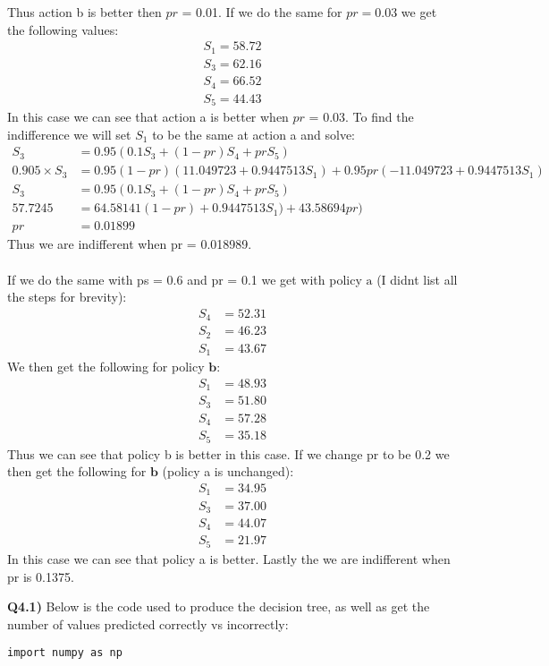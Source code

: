 \documentclass{article}
\begin{document}
\begin{titlepage}
Thus action b is better then $pr$ = 0.01. If we do the same for $pr = 0.03$ we get the following values:
\begin{align*}
S_1 = 58.72\\
S_3 = 62.16\\
S_4 = 66.52\\
S_5 = 44.43
\end{align*}
In this case we can see that action a is better when $pr$ = 0.03. To find the indifference we will set $S_1$ to be the same at action a and solve:
\newpage
\begin{align*}
S_3 &= 0.95(0.1S_3 + (1-pr)S_4 +  prS_5) \\
0.905\times S_3 &= 0.95(1-pr)(11.049723 + 0.9447513S_1) + 0.95pr(-11.049723 + 0.9447513S_1) \\
S_3 &= 0.95(0.1S_3 + (1-pr)S_4 +  prS_5) \\
57.7245 &= 64.58141(1-pr) + 0.9447513S_1) + 43.58694pr) \\
pr &= 0.01899
\end{align*}
Thus we are indifferent when pr = 0.018989.\\\\
If we do the same with ps = 0.6 and pr = 0.1 we get with policy $\text{a}$ (I didnt list all the steps for brevity):
\begin{align*}
S_4 &= 52.31 \\
S_2 &= 46.23 \\
S_1 &= 43.67
\end{align*}
We then get the following for policy $\textbf{b}$:
\begin{align*}
S_1 &= 48.93 \\
S_3 &= 51.80 \\
S_4 &= 57.28 \\
S_5 &= 35.18
\end{align*}
Thus we can see that policy b is better in this case. If we change pr to be 0.2 we then get the following for $\textbf{b}$ (policy a is unchanged):
\begin{align*}
S_1 &= 34.95 \\
S_3 &= 37.00 \\
S_4 &= 44.07 \\
S_5 &= 21.97
\end{align*}
In this case we can see that policy a is better. Lastly the we are indifferent when pr is 0.1375.
\newpage

\textbf{Q4.1)} Below is the code used to produce the decision tree, as well as get the number of values predicted correctly vs incorrectly:
\begin{lstlisting}
import numpy as np


\end{lstlisting}
\end{titlepage}
\end{document}
